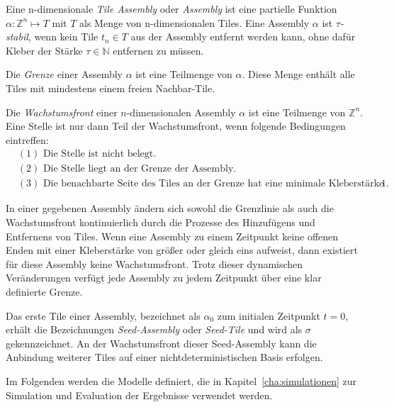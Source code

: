 \begin{definition}
	Eine n-dimensionale \emph{Tile Assembly} oder \emph{Assembly} ist eine partielle Funktion $\alpha:\mathbb{Z}^n\mapsto T$ mit $T$ als Menge von n-dimensionalen Tiles. Eine Assembly $\alpha$ ist \emph{$\tau$-stabil}, wenn kein Tile $t_n\in T$ aus der Assembly entfernt werden kann, ohne dafür Kleber der Stärke $\tau\in\mathbb{N}$ entfernen zu müssen. 
\end{definition}

\begin{definition}
	Die \emph{Grenze} einer Assembly $\alpha$ ist eine Teilmenge von $\alpha$. Diese Menge enthält alle Tiles mit mindestens einem freien Nachbar-Tile.
\end{definition}

\begin{definition}
	Die \emph{Wachstumsfront} einer $n$-dimensionalen Assembly $\alpha$ ist eine Teilmenge von $\mathbb{Z}^n$. Eine Stelle ist nur dann Teil der Wachstumsfront, wenn folgende Bedingungen eintreffen:
	\begin{align*}
		&(1) \text{ Die Stelle ist nicht belegt.}\\
		&(2) \text{ Die Stelle liegt an der Grenze der Assembly.}\\
		&(3) \text{ Die benachbarte Seite des Tiles an der Grenze hat eine minimale Kleberstärke } 1.
	\end{align*}
\end{definition}

In einer gegebenen Assembly ändern sich sowohl die Grenzlinie als auch die Wachstumsfront kontinuierlich durch die Prozesse des Hinzufügens und Entfernens von Tiles. Wenn eine Assembly zu einem Zeitpunkt keine offenen Enden mit einer Kleberstärke von größer oder gleich eins aufweist, dann existiert für diese Assembly keine Wachstumsfront. Trotz dieser dynamischen Veränderungen verfügt jede Assembly zu jedem Zeitpunkt über eine klar definierte Grenze.

Das erste Tile einer Assembly, bezeichnet als $\alpha_0$ zum initialen Zeitpunkt $t=0$, erhält die Bezeichnungen \emph{Seed-Assembly} oder \emph{Seed-Tile} und wird als $\sigma$ gekennzeichnet. An der Wachstumsfront dieser Seed-Assembly kann die Anbindung weiterer Tiles auf einer nichtdeterministischen Basis erfolgen.

Im Folgenden werden die Modelle definiert, die in Kapitel~\ref{cha:simulationen} zur Simulation und Evaluation der Ergebnisse verwendet werden.

